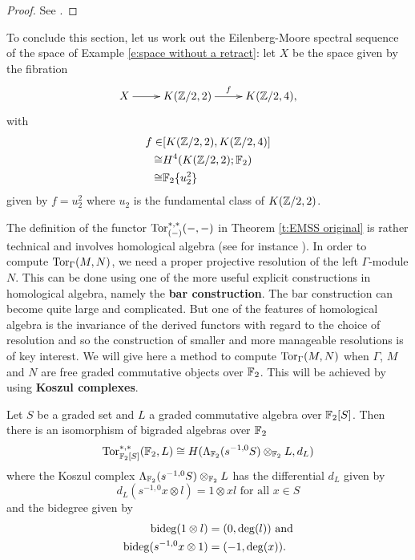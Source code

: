 \begin{proof}
See \cite[Proposition 5.4, p. 325]{Sm67}.
\end{proof}

\medskip
To conclude this section, let us work out the Eilenberg-Moore spectral sequence of the space of Example \ref{e:space without a retract}\label{a:EMSS}: let $X$ be the space given by the fibration
$$\xymatrix{
X\ar[r] &K(\Z/2,2)\ar[r]^-f &K(\Z/2,4),
}$$
with
\begin{align*}
f \in& [K(\mathbb{Z}/2,2),K(\mathbb{Z}/2,4)]\\
\cong &H^4(K(\mathbb{Z}/2,2);\mathbb{F}_2)\\
\cong &\mathbb{F}_2\{u_2^2\}
\end{align*}
given by $f=u_2^2$ where $u_2$ is the fundamental class of $K(\mathbb{Z}/2,2)$.

\medskip
The definition of the functor $\operatorname{Tor}_{(-)}^{*,*}(-,-)$ in Theorem \ref{t:EMSS original} is rather technical and involves homological algebra (see for instance \cite[Definition 7.5, p. 240]{Mc00}). In order to compute $\operatorname{Tor}_\Gamma(M,N)$, we need a proper projective resolution of the left $\Gamma$-module $N$. This can be done using one of the more useful explicit constructions in homological algebra, namely the {\bf bar construction}. The bar construction can become quite large and complicated. But one of the features of homological algebra is the invariance of the derived functors with regard to the choice of resolution and so the construction of smaller and more manageable resolutions is of key interest. We will give here a method to compute $\operatorname{Tor}_\Gamma(M,N)$ when $\Gamma$, $M$ and $N$ are free graded commutative objects over $\mathbb{F}_2$. This will be achieved by using {\bf Koszul complexes}.

\newpage
\begin{thm}
Let $S$ be a graded set and $L$ a graded commutative algebra over $\mathbb{F}_2[S]$. Then there is an isomorphism of bigraded algebras over $\mathbb{F}_2$
$$
\operatorname{Tor}^{*,*}_{\mathbb{F}_2[S]}(\mathbb{F}_2,L)\cong H(\Lambda_{\mathbb{F}_2}(s^{-1,0}S)\otimes_{\mathbb{F}_2}L,d_L)
$$ where the Koszul complex $\Lambda_{\mathbb{F}_2}(s^{-1,0}S)\otimes_{\mathbb{F}_2}L$ has the differential $d_L$ given by
$$
d_L(s^{-1,0}x\otimes l)=1\otimes xl\text{ for all $x\in S$}
$$ and the bidegree given by
\begin{align*}
\operatorname{bideg}(1\otimes l)&=(0,\deg(l))\text{ and}\\
\operatorname{bideg}(s^{-1,0}x\otimes 1)&=(-1,\deg(x)).
\end{align*}
\end{thm}

